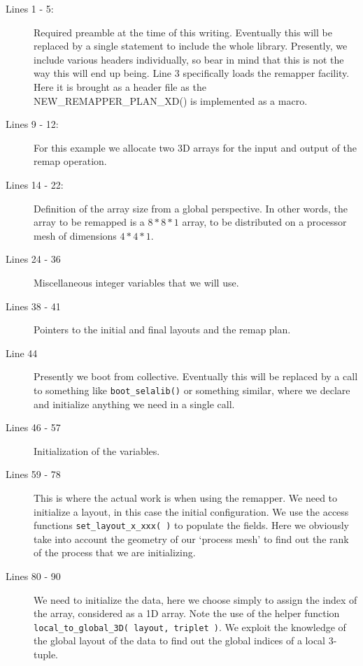\documentclass[]{report}   %
\begin{document}
\begin{description}
\item[Lines 1 - 5:]
Required preamble at the time of this writing. Eventually this will be replaced by a single statement to include the whole library. Presently, we include various headers individually, so bear in mind that this is not the way this will end up being. Line 3 specifically loads the remapper facility. Here it is brought as a header file as the NEW\_REMAPPER\_PLAN\_XD() is implemented as a macro.


\item[Lines 9 - 12: ]
For this example we allocate two 3D arrays for the input and output of the remap operation.

\item[Lines 14 - 22: ]
Definition of the array size from a global perspective. In other words, the array to be remapped is a $8*8*1$ array, to be distributed on a processor mesh of dimensions $4*4*1$. 

\item[Lines 24 - 36]
Miscellaneous integer variables that we will use.

\item[Lines 38 - 41]
Pointers to the initial and final layouts and the remap plan.

\item[Line 44]
Presently we boot from collective. Eventually this will be replaced by a call to something like \verb+boot_selalib()+ or something similar, where we declare and initialize anything we need in a single call.

\item[Lines 46 - 57]
Initialization of the variables.

\item[Lines 59 - 78]
This is where the actual work is when using the remapper. We need to initialize a layout, in this case the initial configuration. We use the access functions \verb+set_layout_x_xxx( )+ to populate the fields. Here we obviously take into account the geometry of our `process mesh' to find out the rank of the process that we are initializing.

\item[Lines 80 - 90]
We need to initialize the data, here we choose simply to assign the index of the array, considered as a 1D array. Note the use of the helper function \verb+local_to_global_3D( layout, triplet )+. We exploit the knowledge of the global layout of the data to find out the global indices of a local 3-tuple.


\end{description}
\end{document}
